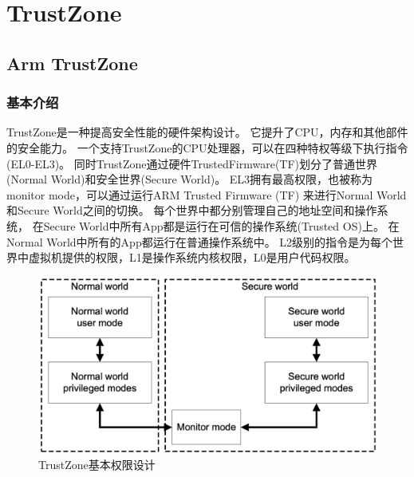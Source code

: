
\chapter{TrustZone} %

\label{Chapter2} %


%



\section{Arm TrustZone}

\subsection{基本介绍} 
TrustZone是一种提高安全性能的硬件架构设计。
它提升了CPU，内存和其他部件的安全能力。
一个支持TrustZone的CPU处理器，可以在四种特权等级下执行指令(EL0-EL3)。
同时TrustZone通过硬件TrustedFirmware(TF)划分了普通世界(Normal World)和安全世界(Secure World)。
EL3拥有最高权限，也被称为monitor mode，可以通过运行ARM Trusted Firmware (TF) 来进行Normal World和Secure World之间的切换。
每个世界中都分别管理自己的地址空间和操作系统，
在Secure World中所有App都是运行在可信的操作系统(Trusted OS)上。
在Normal World中所有的App都运行在普通操作系统中。
L2级别的指令是为每个世界中虚拟机提供的权限，L1是操作系统内核权限，L0是用户代码权限。


\begin{figure}
    \centering
    \includegraphics[scale=0.45]{Figures/trustzone/trustzone.png}
    \decoRule
    \caption{TrustZone基本权限设计}
    \label{fig:trustzone}
\end{figure}


